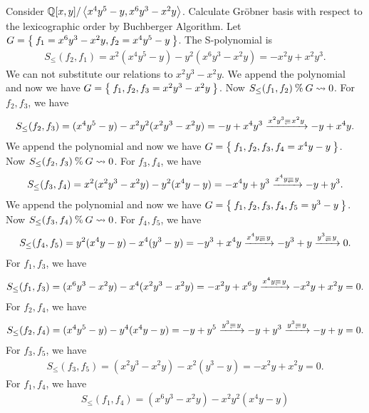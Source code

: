 \begin{example}
  Consider $\mathbb{Q}[x,y]/\Braket{x^4y^5-y,x^6y^3-x^2y}$.
  Calculate Gr\"obner basis
  with respect to the lexicographic order
  by Buchberger Algorithm.
  Let $G=\Set{f_1=x^6y^3-x^2y,f_2=x^4y^5-y}$.
  The S-polynomial is
  \begin{align*}
    S_{\leq}(f_2,f_1)=
    x^2(x^4y^5-y)
    -y^2(x^6y^3-x^2y)
    =-x^2y+x^2y^3.
  \end{align*}
  We can not substitute our relations to $x^2y^3-x^2y$.
  We append the polynomial and now we have 
  $G=\Set{f_1,f_2,f_3=x^2y^3-x^2y}$.
  Now $S_{\leq}(f_1,f_2) \mathbin{\%} G \leadsto 0$.
  For $f_2,f_3$, we have
  \begin{align*}
    S_{\leq}(f_2,f_3)=
    (x^4y^5-y)
    -x^2y^2(x^2y^3-x^2y)
    =-y+x^4y^3
\xrightarrow{x^2y^3\Denotes x^2y}
    -y+x^4y.
  \end{align*}
  We append the polynomial and now we have 
  $G=\Set{f_1,f_2,f_3,f_4=x^4y-y}$.
  Now $S_{\leq}(f_2,f_3) \mathbin{\%} G \leadsto 0$.
  For $f_3,f_4$, we have
  \begin{align*}
    S_{\leq}(f_3,f_4)=
    x^2(x^2y^3-x^2y)
    -y^2(x^4y-y)
    =-x^4y+y^3
\xrightarrow{x^4y\Denotes y}
    -y+y^3.
  \end{align*}
  We append the polynomial and now we have 
  $G=\Set{f_1,f_2,f_3,f_4,f_5=y^3-y}$.
  Now $S_{\leq}(f_3,f_4) \mathbin{\%} G \leadsto 0$.
  For $f_4,f_5$, we have
  \begin{align*}
    S_{\leq}(f_4,f_5)=
    y^2(x^4y-y)
    -x^4(y^3-y)
    =-y^3+x^4y
\xrightarrow{x^4y\Denotes y}
-y^3+y
\xrightarrow{y^3\Denotes y}
    0.
  \end{align*}
  For $f_1,f_3$, we have
  \begin{align*}
    S_{\leq}(f_1,f_3)=
    (x^6y^3-x^2y)
    -x^4(x^2y^3-x^2y)
    =-x^2y+x^6y
\xrightarrow{x^4y\Denotes y}
    -x^2y+x^2y=0.
  \end{align*}
  For $f_2,f_4$, we have
  \begin{align*}
    S_{\leq}(f_2,f_4)=
    (x^4y^5-y)
    -y^4(x^4y-y)
    =-y+y^5
\xrightarrow{y^3\Denotes y}
    -y+y^3
\xrightarrow{y^3\Denotes y}
    -y+y=0.
  \end{align*}
  For $f_3,f_5$, we have
  \begin{align*}
    S_{\leq}(f_3,f_5)=
    (x^2y^3-x^2y)
    -x^2(y^3-y)
    =-x^2y+x^2y=0.
  \end{align*}
  For $f_1,f_4$, we have
  \begin{align*}
    S_{\leq}(f_1,f_4)=
    (x^6y^3-x^2y)
    -x^2y^2(x^4y-y)

\end{align*}
\end{example}
